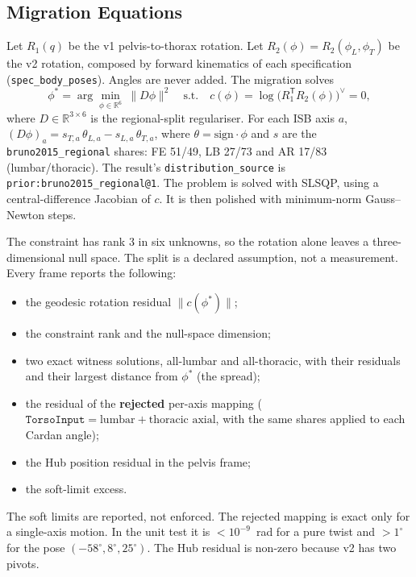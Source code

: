 \documentclass[11pt,a4paper]{article}
\begin{document}
\subsection{Migration Equations}
Let $R_1(q)$ be the v1 pelvis-to-thorax rotation. Let
$R_2(\phi)=R_2(\phi_L,\phi_T)$ be the v2 rotation, composed by forward
kinematics of each specification (\texttt{spec\_body\_poses}). Angles are never
added. The migration solves
\begin{equation}
\phi^\ast=\arg\min_{\phi\in\mathbb{R}^6}\ \lVert D\phi\rVert^2
\quad\text{s.t.}\quad c(\phi)=\log\!\big(R_1^{\mathsf T}R_2(\phi)\big)^\vee=0,
\end{equation}
where $D\in\mathbb{R}^{3\times6}$ is the regional-split regulariser. For each
ISB axis $a$,
$(D\phi)_a=s_{T,a}\,\theta_{L,a}-s_{L,a}\,\theta_{T,a}$, where
$\theta=\text{sign}\cdot\phi$ and $s$ are the \texttt{bruno2015\_regional}
shares: FE 51/49, LB 27/73 and AR 17/83 (lumbar/thoracic). The result's
\texttt{distribution\_source} is \texttt{prior:bruno2015\_regional@1}. The
problem is solved with SLSQP, using a central-difference Jacobian of $c$. It is
then polished with minimum-norm Gauss--Newton steps.

The constraint has rank 3 in six unknowns, so the rotation alone leaves a
three-dimensional null space. The split is a declared assumption, not a
measurement. Every frame reports the following:
\begin{itemize}
\item the geodesic rotation residual $\lVert c(\phi^\ast)\rVert$;
\item the constraint rank and the null-space dimension;
\item two exact witness solutions, all-lumbar and all-thoracic, with their
residuals and their largest distance from $\phi^\ast$ (the spread);
\item the residual of the \textbf{rejected} per-axis mapping
($\texttt{TorsoInput}=\text{lumbar}+\text{thoracic axial}$, with the same
shares applied to each Cardan angle);
\item the Hub position residual in the pelvis frame;
\item the soft-limit excess.
\end{itemize}
The soft limits are reported, not enforced. The rejected mapping is exact only
for a single-axis motion. In the unit test it is $<10^{-9}$~rad for a pure
twist and $>1^\circ$ for the pose $(-58^\circ,8^\circ,25^\circ)$. The Hub
residual is non-zero because v2 has two pivots.
\end{document}
